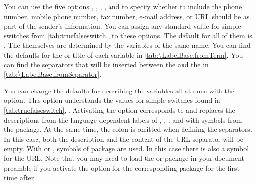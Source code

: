 \begin{Declaration}
\end{Declaration}
%
%
You can use the five options ,
, ,
, and  to specify whether to include the
phone number,
mobile phone number, fax number, e-mail
address, or URL should be as part of the sender's
information. You can assign any standard value for simple switches from
\autoref{tab:truefalseswitch},  to these
options. The default for all of them is . The 
themselves are determined by the variables of the same name. You can find the
defaults for the  or title of each variable in
\autoref{tab:\LabelBase.fromTerm}. You can find the separators that will be
inserted between the  and the  in
\autoref{tab:\LabelBase.fromSeparator}.

You can
change the defaults for describing the variables all at once with the
 option. This option understands the values for simple
switches found in \autoref{tab:truefalseswitch},
.
Activating the
option corresponds to   and replaces the
descriptions from the language-dependent labels of
,
,
, and
 with symbols from the
 package. At the same time, the colon
is omitted when defining the separators. In this case, both the description
and the content of the URL separator will be empty. With
 or
, symbols of package
 are used. In this case there
is also a symbol for the URL. Note that you may need to
load the  or  package in your document
preamble if you activate the option for the corresponding package for the
first time after .

